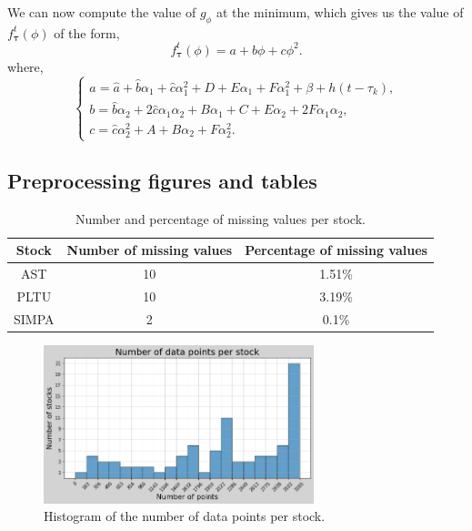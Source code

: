 \documentclass[11pt]{article}
\begin{document}
We can now compute the value of $g_\phi$ at the minimum, which gives us the value of $f_{\boldsymbol{\tau}}^t(\phi)$ of the form,
$$ f_{\boldsymbol{\tau}}^t(\phi) = a + b\phi + c\phi^2. $$
where,
\begin{equation*}
    \begin{cases}
        a = \hat{a} + \hat{b}\alpha_1 + \hat{c}\alpha_1^2 + D + E\alpha_1 + F\alpha_1^2 + \beta + h(t-\tau_k), \\
        b = \hat{b}\alpha_2 + 2\hat{c}\alpha_1\alpha_2 + B\alpha_1 + C + E\alpha_2 + 2F\alpha_1\alpha_2,       \\
        c = \hat{c}\alpha_2^2 + A + B\alpha_2 + F\alpha_2^2.
    \end{cases}
\end{equation*}
\subsection{Preprocessing figures and tables}

\begin{table}[H]
    \centering
    \begin{tabular}{|c|c|c|}
        \hline
        Stock & Number of missing values & Percentage of missing values \\
        \hline
        AST   & 10                       & 1.51\%                       \\
        PLTU  & 10                       & 3.19\%                       \\
        SIMPA & 2                        & 0.1\%                        \\
        \hline
    \end{tabular}
    \caption{Number and percentage of missing values per stock.}
    \label{tab:missing_values}
\end{table}

\begin{figure}[H]
    \centering
    \includegraphics[width=0.7\textwidth]{figures/preprocessing/histogram_size.png}
    \caption{Histogram of the number of data points per stock.}
    \label{fig:histogram_size}
\end{figure}
\end{document}
